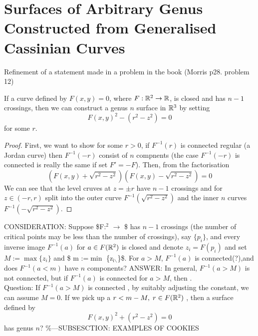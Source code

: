 \documentclass{article}
\begin{document}
\section{Surfaces of Arbitrary Genus Constructed from Generalised Cassinian Curves}
\label{sec-2}
Refinement of a statement made in a problem in the book (Morris \cite{Hirsch} p28. problem 12)
\begin{thm}
 If a curve defined by $F(x,y) = 0$, where $F:\mathbb R^2 \rightarrow \mathbb R$, is closed and has $n-1$ crossings, then we can construct a genus $n$ surface in $\mathbb R^3$ by setting
\begin{equation}
\label{ }
F(x,y)^2 - ( r^2 - z^2) = 0 
\end{equation}
for some $r$.
\end{thm}
\begin{proof}
 First, we want to show for some $r > 0$, if $F^{-1}(r)$ is connected regular (a Jordan curve) then $F^{-1}(-r)$ consist of $n$ compnents (the case $F^{-1}(-r)$ is connected is really the same if set $F' = -F$). Then, from the factorisation
\begin{equation}
\label{ }
(F(x,y) + \sqrt{r^2-z^2})(F(x,y) - \sqrt{r^2-z^2}) = 0
\end{equation}
 We can see that the level cruves at $z=\pm r$ have $n-1$ crossings and for $z \in (-r,r)$ split into the outer curve $F^{-1}(\sqrt{r^2-z^2})$ and the inner $n$ curves $F^{-1}(-\sqrt{r^2-z^2})$.
\end{proof}
CONSIDERATION: Suppose \$F:\R$^{\text{2}}$ $\rightarrow$ \R \$ has $n-1$ crossings (the number of critical points may be less than the number of crossings), say $\{p_{i}\}$, and every inverse image $F^{-1}(a)$ for $a\in F(\mathbb R^2)$ is closed and denote $z_i=F(p_i)$ and set $M:= \max\{z_i\}$ and \$ m :=$\min$ \{z$_{\text{i$\backslash$}}$\}\$. For $a>M$, $F^{-1}(a)$ is connected(?),and does $F^{-1}(a<m)$ have $n$ components? ANSWER: In general, $F^{-1}(a>M)$ is not connected, but if $F^{-1}(a)$ is connected for $a>M$, then .\\
Question: If $F^{-1}(a>M)$ is connected , by suitably adjusting the constant, we can assume $M=0$. If we pick up a $r< m-M, \; r \in F(\mathbb R^2)$ , then a surface defined by
\begin{equation}
\label{ }
F(x,y)^2 + (r^2 - z^2) = 0
\end{equation}
has genus $n$?
\%---SUBSESCTION: EXAMPLES OF COOKIES
\end{document}
